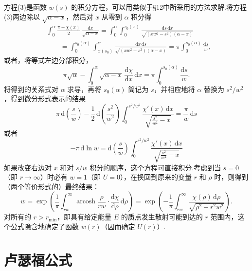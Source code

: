 \begin{xiti}
方程(3)是函数 $w(s)$ 的积分方程，可以用类似于§12中所采用的方法求解.将方程(3)两边除以 $\sqrt{\alpha-x}$，然后对 $x$ 从零到 $\alpha$ 积分得
\begin{equation*}
\begin{aligned}
  &\int_0^{\alpha}\frac{\pi-\chi(x)}{2}\,\frac{\mathrm{d}x}{\sqrt{\alpha-x}}
  =\int_0^{\alpha}\int_0^{s_0(x)}
  \frac{\mathrm{d}s\,\mathrm{d}x}{\sqrt{(xw^2-s^2)(\alpha-x)}}\\
  &\qquad=\int_0^{s_0(\alpha)}\int_{x(s_0)}^{\alpha}
  \frac{\mathrm{d}x\,\mathrm{d}s}{\sqrt{(xw^2-s^2)(\alpha-x)}}
  =\pi\int_0^{s_0(\alpha)}\frac{\mathrm{d}s}{w},
\end{aligned}
\end{equation*}
或者，将等式左边分部积分，
\begin{equation*}
  \pi\sqrt{\alpha}-\int_0^{\alpha}\sqrt{\alpha-x}\,
  \frac{\mathrm{d}\chi}{\mathrm{d}x}\,\mathrm{d}x
  =\pi\int_0^{s_0(\alpha)}\frac{\mathrm{d}s}{w}.
\end{equation*}
将得到的关系式对 $\alpha$ 求导，再将 $s_0(\alpha)$ 简记为 $s$，并相应地将 $\alpha$ 替换为 $s^2/w^2$，得到微分形式表示的结果
\begin{equation*}
  \pi\,\mathrm{d}\left(\frac{s}{w}\right)
  -\frac{1}{2}\,\mathrm{d}\left(\frac{s^2}{w^2}\right)
  \int_0^{s^2/w^2}\frac{\chi'(x)\,\mathrm{d}x}{\sqrt{\frac{s^2}{w^2}-x}}
  =\frac{\pi}{w}\,\mathrm{d}s
\end{equation*}
或者
\begin{equation*}
  -\pi\,\mathrm{d}\ln w
  =\mathrm{d}\left(\frac{s}{w}\right)\int_0^{s^2/w^2}
  \frac{\chi'(x)\,\mathrm{d}x}{\sqrt{\frac{s^2}{w^2}-x}}
\end{equation*}
如果改变右边对 $x$ 和对 $s/w$ 积分的顺序，这个方程可直接积分.考虑到当 $s=0$（即 $r\to\infty$）时必有 $w=1$（即 $U=0$），在换回到原来的变量 $r$ 和 $\rho$ 时，则得到（两个等价形式的）最终结果：
\begin{equation*}
  w=\exp\left(\frac{1}{\pi}\int_{rw}^{\infty}
  \operatorname{arcosh}\frac{\rho}{rw}\cdot
  \frac{\mathrm{d}\chi}{\mathrm{d}\rho}\,\mathrm{d}\rho\right)
  =\exp\left(-\frac{1}{\pi}\int_{rw}^{\infty}
  \frac{\chi(\rho)\,\mathrm{d}\rho}{\sqrt{\rho^2-r^2w^2}}\right).\tag{4}
\end{equation*}
对所有的 $r>r_\mathrm{min}$，即具有给定能量 $E$ 的质点发生散射可能到达的 $r$ 范围内，这个公式隐含地确定了函数 $w(r)$（因而确定 $U(r)$）.

\end{xiti}

\section{卢瑟福公式}

